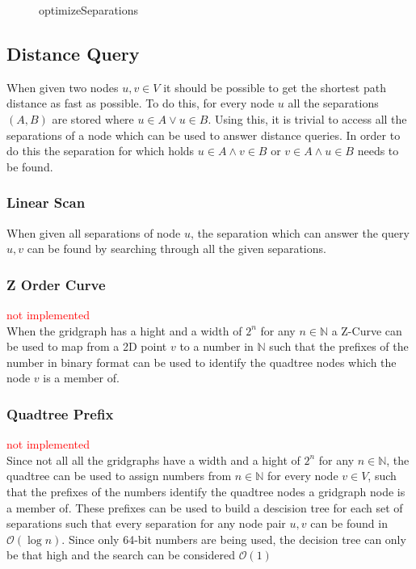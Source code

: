 \documentclass{article}
\begin{document}
\begin{figure}[ht!]
  \begin{algorithm}[H]


    \caption{optimizeSeparations}
    \label{alg:OptSeparations}
  \end{algorithm}
\end{figure}

\subsection{Distance Query}
When given two nodes $u, v \in V$ it should be possible to get the shortest path distance as fast as possible.
To do this, for every node $u$ all the separations $(A, B)$ are stored where $u \in A \lor u \in B$.
Using this, it is trivial to access all the separations of a node which can be used to answer distance queries.
In order to do this the separation for which holds $u \in A \land v \in B$ or $v \in A \land u \in B$ needs to be found.

\subsubsection{Linear Scan}
When given all separations of node $u$, the separation which can answer the query $u, v$ can be found by searching through all the
given separations.

\subsubsection{Z Order Curve}
\textcolor{red}{not implemented\\}
When the gridgraph has a hight and a width of $2^n$ for any $n \in \mathbb{N}$ a Z-Curve
can be used to map from a 2D point $v$ to a number in $\mathbb{N}$ such that the prefixes of the number in binary format can be used to
identify the quadtree nodes which the node $v$ is a member of.

\subsubsection{Quadtree Prefix}
\textcolor{red}{not implemented\\}
Since not all all the gridgraphs have a width and a hight of $2^n$ for any $n \in \mathbb{N}$,
the quadtree can be used to assign numbers from $n \in \mathbb{N}$ for every node $v \in V$, such that the prefixes of the numbers identify the quadtree nodes a gridgraph node is a member of.
These prefixes can be used to build a descision tree for each set of separations such that every separation for any node pair $u, v$ can be found in $\mathcal{O}(\log{}n)$.
Since only 64-bit numbers are being used, the decision tree can only be that high and the search can be considered $\mathcal{O}(1)$
\end{document}
